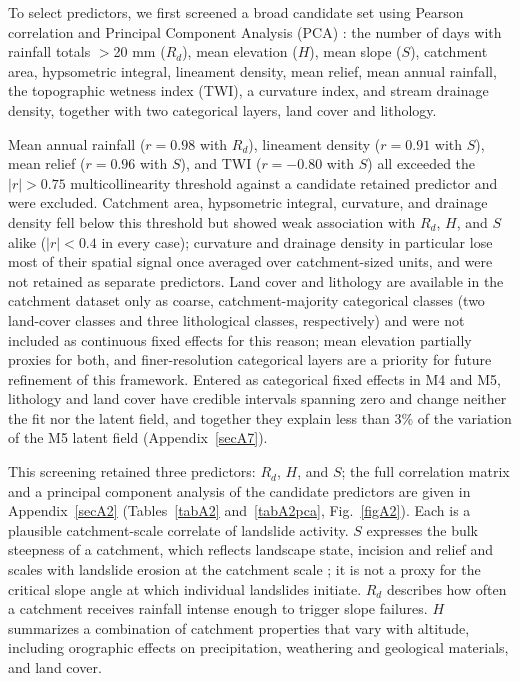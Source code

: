 \documentclass[journal abbreviation, manuscript]{copernicus}
\newcommand{\hl}[1]{#1}
\newcommand{\hlE}[1]{#1}
\begin{document}
\hl{To select predictors, we first screened a broad candidate set using Pearson correlation and Principal Component Analysis (PCA) }\citep{reichenbach2018review}\hl{: the number of days with rainfall totals $>$20 mm ($R_d$), mean elevation ($H$), mean slope ($S$), catchment area, hypsometric integral, lineament density, mean relief, mean annual rainfall, the topographic wetness index (TWI), a curvature index, and stream drainage density, together with two categorical layers, land cover and lithology.}

\hl{Mean annual rainfall ($r = 0.98$ with $R_d$), lineament density ($r = 0.91$ with $S$), mean relief ($r = 0.96$ with $S$), and TWI ($r = -0.80$ with $S$) all exceeded the $|r| > 0.75$ multicollinearity threshold against a candidate retained predictor and were excluded. 
Catchment area, hypsometric integral, curvature, and drainage density fell below this threshold but showed weak association with $R_d$, $H$, and $S$ alike ($|r| < 0.4$ in every case); curvature and drainage density in particular lose most of their spatial signal once averaged over catchment-sized units, and were not retained as separate predictors. 
Land cover and lithology are available in the catchment dataset only as coarse, catchment-majority categorical classes (two land-cover classes and three lithological classes, respectively) and were not included as continuous fixed effects for this reason; mean elevation partially proxies for both, and finer-resolution categorical layers are a priority for future refinement of this framework.} \hlE{Entered as categorical fixed effects in M4 and M5, lithology and land cover have credible intervals spanning zero and change neither the fit nor the latent field, and together they explain less than 3\% of the variation of the M5 latent field (\mbox{Appendix~\ref{secA7}}).}

\hl{This screening retained three predictors: $R_d$, $H$, and} \hlE{$S$; the full correlation matrix and a principal component analysis of the candidate predictors are given in \mbox{Appendix~\ref{secA2}} (\mbox{Tables~\ref{tabA2}} and~\mbox{\ref{tabA2pca}}, \mbox{Fig.~\ref{figA2}}).} 
\hlE{Each is a plausible catchment-scale correlate of landslide activity. $S$ expresses the bulk steepness of a catchment, which reflects landscape state, incision and relief and scales with landslide erosion at the catchment scale }\citep{Montgomery2002, Larsen2012}\hlE{; it is not a proxy for the critical slope angle at which individual landslides initiate. $R_d$ describes how often a catchment receives rainfall intense enough to trigger slope failures. $H$ summarizes a combination of catchment properties that vary with altitude, including orographic effects on precipitation, weathering and geological materials, and land cover.}
\end{document}

